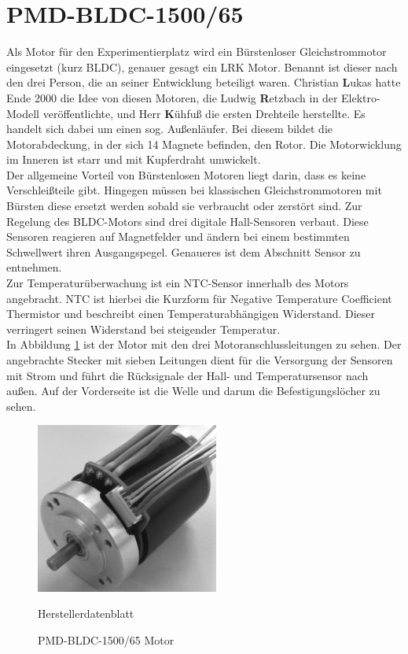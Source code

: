 \newpage
\section{PMD-BLDC-1500/65}
Als Motor für den Experimentierplatz wird ein Bürstenloser Gleichstrommotor eingesetzt (kurz BLDC), genauer gesagt ein LRK Motor. 
Benannt ist dieser nach den drei Person, die an seiner Entwicklung beteiligt waren.
Christian \textbf{L}ukas hatte Ende 2000 die Idee von diesen Motoren, die Ludwig \textbf{R}etzbach in der Elektro-Modell veröffentlichte, und Herr \textbf{K}ühfuß die ersten Drehteile herstellte.
Es handelt sich dabei um einen sog. Außenläufer.
Bei diesem bildet die Motorabdeckung, in der sich 14 Magnete befinden, den Rotor.
Die Motorwicklung im Inneren ist starr und mit Kupferdraht umwickelt.\\


Der allgemeine Vorteil von Bürstenlosen Motoren liegt darin, dass es keine Verschleißteile gibt.
Hingegen müssen bei klassischen Gleichstrommotoren mit Bürsten diese ersetzt werden sobald sie verbraucht oder zerstört sind.
Zur Regelung des BLDC-Motors sind drei digitale Hall-Sensoren verbaut.
Diese Sensoren reagieren auf Magnetfelder und ändern bei einem bestimmten Schwellwert ihren Ausgangspegel.
Genaueres ist dem Abschnitt Sensor zu entnehmen.\\


Zur Temperaturüberwachung ist ein NTC-Sensor innerhalb des Motors angebracht. 
NTC ist hierbei die Kurzform für Negative Temperature Coefficient Thermistor und beschreibt einen Temperaturabhängigen Widerstand.
Dieser verringert seinen Widerstand bei steigender Temperatur.\\

In Abbildung \ref{fig:BLDC} ist der Motor mit den drei Motoranschlussleitungen zu sehen.
Der angebrachte Stecker mit sieben Leitungen dient für die Versorgung der Sensoren mit Strom und führt die Rücksignale der Hall- und Temperatursensor nach außen.
Auf der Vorderseite ist die Welle und darum die Befestigungslöcher zu sehen.

\begin{figure}[htbp]
	\centering
	\includegraphics[width=6cm]{hardware/graphics/BLDC_Motor}
	\caption{PMD-BLDC-1500/65 Motor}
	\quelle Herstellerdatenblatt
	\label{fig:BLDC}
\end{figure}


